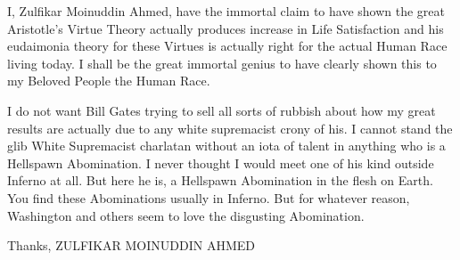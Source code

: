 \documentclass{amsart}
\begin{document}
I, Zulfikar Moinuddin Ahmed, have the immortal claim to have shown the great Aristotle's Virtue Theory actually produces increase in Life Satisfaction and his eudaimonia theory for these Virtues is actually right for the actual Human Race living today.  I shall be the great immortal genius to have clearly shown this to my Beloved People the Human Race.

I do not want Bill Gates trying to sell all sorts of rubbish about how my great results are actually due to any white supremacist crony of his.  I cannot stand the glib White Supremacist charlatan without an iota of talent in anything who is a Hellspawn Abomination.  I never thought I would meet one of his kind outside Inferno at all.  But here he is, a Hellspawn Abomination in the flesh on Earth.  You find these Abominations usually in Inferno.  But for whatever reason, Washington and others seem to love the disgusting Abomination.

Thanks,
ZULFIKAR MOINUDDIN AHMED
\end{document}
